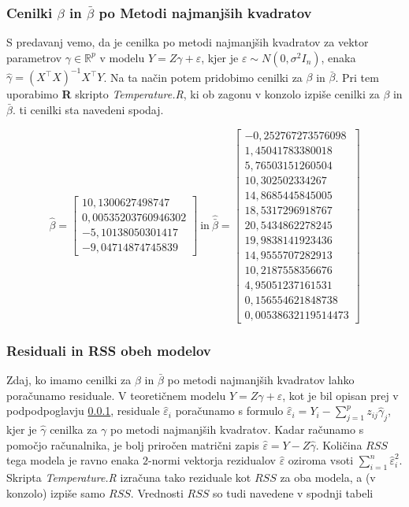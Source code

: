 \documentclass[a4paper, 10pt]{article}
\newcommand{\mth}[1]{\ensuremath{\mathbb{#1}}}
\newcommand{\R}{\mth{R}}
\begin{document}
	\subsubsection{Cenilki $\beta$ in $\bar{\beta}$ po Metodi najmanjših kvadratov}\label{subsubsect: 3ACenilki}
	
	S predavanj vemo, da je cenilka po metodi najmanjših kvadratov za vektor parametrov $\gamma\in\R^p$ v modelu $Y = Z\gamma + \varepsilon$, kjer je $\varepsilon \sim N(0, \sigma^2 I_n)$, enaka $\widehat{\gamma} = (X^{\top}X)^{-1}X^{\top}Y$. Na ta način potem pridobimo cenilki za $\beta$ in $\bar{\beta}$. Pri tem uporabimo \textbf{R} skripto \textit{Temperature.R}, ki ob zagonu v konzolo izpiše cenilki za $\beta$ in $\bar{\beta}$. ti cenilki sta navedeni spodaj.
	
	\[ 
	\widehat{\beta} = \begin{bmatrix}
			10{,}1300627498747 \\
			0{,}00535203760946302 \\                     
			-5{,}10138050301417 \\
			-9{,}04714874745839
		\end{bmatrix}~\text{in}~\widehat{\bar{\beta}} = \begin{bmatrix}
			-0{,}252767273576098 \\
			1{,}45041783380018 \\
			5{,}76503151260504 \\
			10{,}302502334267 \\
			14{,}8685445845005 \\
			18{,}5317296918767 \\
			20{,}5434862278245 \\
			19{,}9838141923436 \\
			14{,}9555707282913 \\
			10{,}2187558356676 \\
			4{,}95051237161531 \\
			0{,}156554621848738 \\
			0{,}00538632119514473
	\end{bmatrix}
	\]
	
	\subsubsection{Residuali in RSS obeh modelov}\label{subsubsect: 3AResiduali}
	Zdaj, ko imamo cenilki za $\beta$ in $\bar{\beta}$ po metodi najmanjših kvadratov lahko poračunamo residuale. V teoretičnem modelu $Y = Z\gamma + \varepsilon$, kot je bil opisan prej v podpodpoglavju \ref{subsubsect: 3ACenilki}, residuale $\widehat{\varepsilon}_i$ poračunamo s formulo $\widehat{\varepsilon}_i = Y_i - \sum_{j = 1}^{p}z_{ij}\widehat{\gamma}_j$, kjer je $\widehat{\gamma}$ cenilka za $\gamma$ po metodi najmanjših kvadratov. Kadar računamo s pomočjo računalnika, je bolj priročen matrični zapis $\widehat{\varepsilon} = Y - Z\widehat{\gamma}$. Količina $RSS$ tega modela je ravno enaka $2$-normi vektorja rezidualov $\widehat{\varepsilon}$ oziroma vsoti $\sum_{i = 1}^{n}\widehat{\varepsilon}_i^2$. Skripta \textit{Temperature.R} izračuna tako reziduale kot $RSS$ za oba modela, a (v konzolo) izpiše samo $RSS$. Vrednosti $RSS$ so tudi navedene v spodnji tabeli
	
\end{document}
